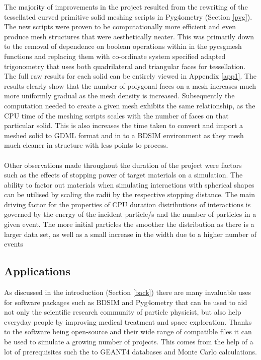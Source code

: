 \documentclass[12pt,a4paper]{article}
\begin{document}
The majority of improvements in the project resulted from the rewriting of the tessellated curved primitive solid meshing scripts in Pyg4ometry (Section \ref{pyg}). The new scripts were proven to be computationally more efficient and even produce mesh structures that were aesthetically neater. This was primarily down to the removal of dependence on boolean operations within in the pycsgmesh functions and replacing them with co-ordinate system specified adapted trigonometry that uses both quadrilateral and triangular faces for tessellation. The full raw results for each solid can be entirely viewed in Appendix \ref{app1}. The results clearly show that the number of polygonal faces on a mesh increases much more uniformly gradual as the mesh density is increased. Subsequently the computation needed to create a given mesh exhibits the same relationship, as the CPU time of the meshing scripts scales with the number of faces on that particular solid. This is also increases the time taken to convert and import a meshed solid to GDML format and in to a BDSIM environment as they mesh much cleaner in structure with less points to process. 
\\\\
Other observations made throughout the duration of the project were factors such as the effects of stopping power of target materials on a simulation. The ability to factor out materials when simulating interactions with spherical shapes can be utilised by scaling the radii by the respective stopping distance. The main driving factor for the properties of CPU duration distributions of interactions is governed by the energy of the incident particle/s and the number of particles in a given event. The more initial particles the smoother the distribution as there is a larger data set, as well as a small increase in the width due to a higher number of events 

\subsection{Applications}
As discussed in the introduction (Section \ref{back}) there are many invaluable uses for software packages such as BDSIM and Pyg4ometry that can be used to aid not only the scientific research community of particle physicist, but also help everyday people by improving medical treatment and space exploration. Thanks to the software being open-source and their wide range of compatible files it can be used to simulate a growing number of projects. This comes from the help of a lot of prerequisites such the to GEANT4 databases and Monte Carlo calculations.
\end{document}
